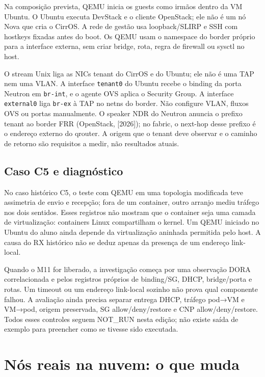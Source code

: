 \documentclass[12pt,openany,oneside,a4paper,chapter=TITLE,english,brazil]{abntex2}
\begin{document}
Na composição prevista, QEMU inicia os guests como irmãos dentro da VM Ubuntu.
O Ubuntu executa DevStack e o cliente OpenStack; ele não é um nó Nova que cria o
CirrOS. A rede de gestão usa loopback/SLIRP e SSH com hostkeys fixadas antes do
boot. Os QEMU usam o namespace do border próprio para a interface externa, sem
criar bridge, rota, regra de firewall ou sysctl no host.

O stream Unix liga as NICs tenant do CirrOS e do Ubuntu; ele não é uma TAP nem
uma VLAN. A interface \texttt{tenant0} do Ubuntu recebe o binding da porta Neutron em
\texttt{br-{}\allowbreak{}int}, e o agente OVS aplica o Security Group. A interface \texttt{external0} liga
\texttt{br-{}\allowbreak{}ex} à TAP no netns do border. Não configure VLAN, fluxos OVS ou portas
manualmente. O speaker NDR do Neutron anuncia o prefixo tenant ao border FRR
(OpenStack, {[}2026{]}); no fabric, o next-hop desse prefixo é o endereço externo
do qrouter. A origem
que o tenant deve observar e o caminho de retorno são requisitos a medir, não
resultados atuais.

\section{Caso C5 e diagnóstico}\label{caso-c5-e-diagnuxf3stico}

No caso histórico C5, o teste com QEMU em uma topologia modificada teve
assimetria de envio e recepção; fora de um container, outro arranjo mediu
tráfego nos dois sentidos. Esses registros não mostram que o container seja
uma camada de virtualização: containers Linux compartilham o kernel. Um
QEMU iniciado no Ubuntu do aluno ainda depende da virtualização aninhada
permitida pelo host. A causa do RX histórico não se deduz apenas da presença de
um endereço link-local.

Quando o M11 for liberado, a investigação começa por uma observação DORA
correlacionada e pelos registros próprios de binding/SG, DHCP, bridge/porta e
rotas. Um timeout ou um endereço link-local sozinho não prova qual componente
falhou. A avaliação ainda precisa separar entrega DHCP, tráfego pod→VM e
VM→pod, origem preservada, SG allow/deny/restore e CNP allow/deny/restore.
Todos esses controles seguem NOT\_RUN nesta edição; não existe saída de exemplo
para preencher como se tivesse sido executada.

\chapter{Nós reais na nuvem: o que muda}\label{nuxf3s-reais-na-nuvem-o-que-muda}
\end{document}
